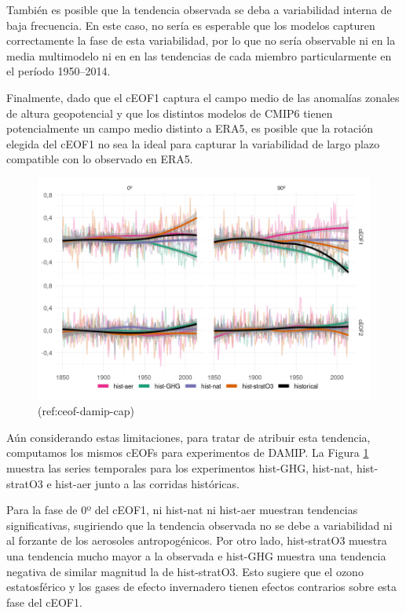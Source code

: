 \documentclass[12pt,oneside,a4paper]{reedthesis}
\begin{document}
También es posible que la tendencia observada se deba a variabilidad interna de baja frecuencia.
En este caso, no sería es esperable que los modelos capturen correctamente la fase de esta variabilidad, por lo que no sería observable ni en la media multimodelo ni en en las tendencias de cada miembro particularmente en el período 1950--2014.

Finalmente, dado que el cEOF1 captura el campo medio de las anomalías zonales de altura geopotencial y que los distintos modelos de CMIP6 tienen potencialmente un campo medio distinto a ERA5, es posible que la rotación elegida del cEOF1 no sea la ideal para capturar la variabilidad de largo plazo compatible con lo observado en ERA5.

\begin{figure}

{\centering \includegraphics{figures/50-cmip6/ceof-damip-1} 

}

\caption{(ref:ceof-damip-cap)}\label{fig:ceof-damip}
\end{figure}

Aún considerando estas limitaciones, para tratar de atribuir esta tendencia, computamos los mismos cEOFs para experimentos de DAMIP.
La Figura \ref{fig:ceof-damip} muestra las series temporales para los experimentos hist-GHG, hist-nat, hist-stratO3 e hist-aer junto a las corridas históricas.

Para la fase de 0º del cEOF1, ni hist-nat ni hist-aer muestran tendencias significativas, sugiriendo que la tendencia observada no se debe a variabilidad ni al forzante de los aerosoles antropogénicos.
Por otro lado, hist-stratO3 muestra una tendencia mucho mayor a la observada e hist-GHG muestra una tendencia negativa de similar magnitud la de hist-stratO3.
Esto sugiere que el ozono estatosférico y los gases de efecto invernadero tienen efectos contrarios sobre esta fase del cEOF1.
\end{document}
